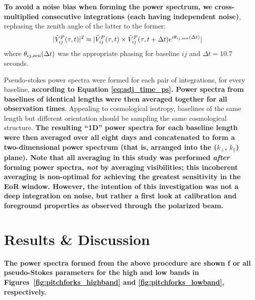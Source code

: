 \documentclass[twocolumn, trackchanges]{aastex61}
\newcommand{\edited}[1]{{\bf \color{red} #1}}
\begin{document}
\edited{To avoid a noise bias when forming the power spectrum, 
we cross-multiplied consecutive integrations (each having independent noise)}, 
rephasing the zenith angle of the latter to the former:
\begin{equation}
\label{eq:adj_time_ps}
 | \tilde{V}_{ij}^{P}(\tau, t) |^2 \approx | \tilde{V}_{ij}^{P}(\tau, t) \times \tilde{V}_{ij}^{P}(\tau, t+\Delta t)e^{i\theta_{ij,\rm zen}(\Delta t)}|
\end{equation}
where $\theta_{ij,\rm zen}(\Delta t)$ was the appropriate phasing for baseline $ij$ and $\Delta t = 10.7$ seconds.

Pseudo-stokes power spectra were formed for each pair of integrations, for every baseline, \edited{according to Equation \ref{eq:adj_time_ps}.  Power spectra from baselines of identical lengths were then averaged together for all observation times}.  Appealing to cosmological isotropy, baselines of the same length but different orientation should be sampling the same cosmological structure.  
\edited{The resulting ``1D'' power spectra for each baseline length were then averaged over all eight days and concatenated to form a  two-dimensional power spectrum (that is, arranged into the ($k_{\perp}$, $k_{\parallel}$) plane).  Note that all averaging in this study was performed {\it after} forming power spectra, {\it not} by averaging visibilities; this incoherent averaging is non-optimal for achieving the greatest sensitivity in the EoR window.  However, the intention of this investigation was not a deep integration on noise, but rather a first look at calibration and foreground properties as observed through the polarized beam.}

\section{Results \& Discussion}
\label{sec:results}

\edited{The power spectra formed from the above procedure are shown f or all pseudo-Stokes parameters for the high and low bands in Figures~\ref{fig:pitchforks_highband} and \ref{fig:pitchforks_lowband}, respectively.   
} 
\end{document}
